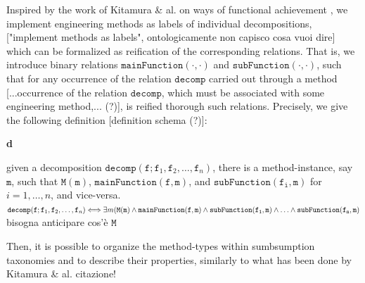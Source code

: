 \documentclass[sw]{iosart2x}
\newcommand{\bflist}{\begin{list}{}{\setlength{\topsep}{2mm}\setlength{\partopsep}{0mm}\setlength{\parsep}{0mm}\setlength{\leftmargin}{9mm}\setlength{\labelwidth}{8mm}}}
\newcommand{\eflist}{\end{list}}
\newcommand{\DefLabel}{\textrm{d}}
\newcounter{cntdef}
\newcommand{\mydf}[1]{\refstepcounter{cntdef}\begin{small}{\bf \DefLabel\thecntdef\label{def:#1}}\end{small}}
\newcommand{\generalStyle}[1]{\texttt{#1}}
\newcommand{\biRel}[3]{\generalStyle{#1}(#2,#3)}
\newcommand{\cst}[1]{\ensuremath{\mathtt{#1}}}
\newcommand{\myiff}{\Longleftrightarrow}
\newcommand{\mainFunction}[2]{\biRel{mainFunction}{#1}{#2}}
\newcommand{\subFunction}[2]{\biRel{subFunction}{#1}{#2}}
\newcommand{\decom}{\generalStyle{decomp}}
\newcommand{\TODO}[1]{{\color{red} #1}}
\newcommand{\myComment}[1]{}
\begin{document}
{Inspired by the work of Kitamura \& al. on ways of functional achievement \cite{kitamuraOntologicalModelDevice2006, kitamuraOntologybasedDescriptionFunctional2003}, we implement engineering methods as labels of individual decompositions,\TODO{["implement methods as labels", ontologicamente non capisco cosa vuoi dire]} which can be formalized as reification of the corresponding relations.
That is, we introduce binary relations $\mainFunction{\cdot}{\cdot}$ and $\subFunction{\cdot}{\cdot}$, such that for any occurrence of the relation $\decom$ carried out through a method\TODO{[...occurrence of the relation $\decom$, which must be associated with some engineering method,... (?)]}, is reified thorough such relations.
Precisely, we give the following definition\TODO{[definition schema (?)]}:
\bflist
  \item[\mydf{method}] given a decomposition $\decom(\cst{f};\cst{f}_1,\cst{f}_2,\dots,\cst{f}_n)$, there is \myComment{a corresponding method-type, say $\mathtt{M}$, and an instance of that type} a method-instance, say $\cst{m}$, such that 
  $ \mathtt{M}(\cst{m})$, $\mainFunction{\cst{f}}{\cst{m}}$, and $\subFunction{\cst{f_i}}{\cst{m}}$ for $i=1, \dots, n$, and vice-versa.
 \\
 \TODO{$\decom(\cst{f};\cst{f}_1,\cst{f}_2,\dots,\cst{f}_n) \myiff \exists m (\mathtt{M}(\cst{m}) \land \mainFunction{\cst{f}}{\cst{m}} \land \subFunction{\cst{f_1}}{\cst{m}} \land \ldots \land\\
 \mbox{} \hfill \subFunction{\cst{f_n}}{\cst{m}}
 $\\
 bisogna anticipare cos'è $\mathtt{M}$}
\eflist
Then, it is possible to organize the method-types within sumbsumption taxonomies and to describe their properties, similarly to what has been done by Kitamura \& al.\TODO{citazione!}

}
\end{document}
